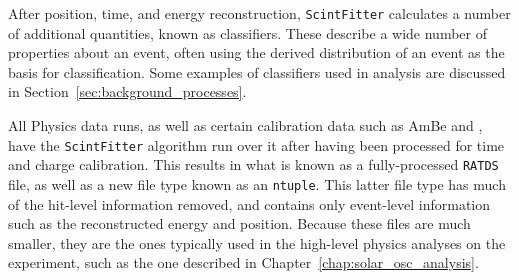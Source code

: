 After position, time, and energy reconstruction, \texttt{ScintFitter} calculates a number of additional quantities, known as classifiers. These describe a wide number of properties about an event, often using the derived \tres{} distribution of an event as the basis for classification. Some examples of classifiers used in analysis are discussed in Section~\ref{sec:background_processes}.

All Physics data runs, as well as certain calibration data such as AmBe and , have the \texttt{ScintFitter} algorithm run over it after having been processed for time and charge calibration. This results in what is known as a fully-processed \texttt{RATDS} file, as well as a new file type known as an \texttt{ntuple}. This latter file type has much of the hit-level information removed, and contains only event-level information such as the reconstructed energy and position. Because these files are much smaller, they are the ones typically used in the high-level physics analyses on the experiment, such as the one described in Chapter~\ref{chap:solar_osc_analysis}.


